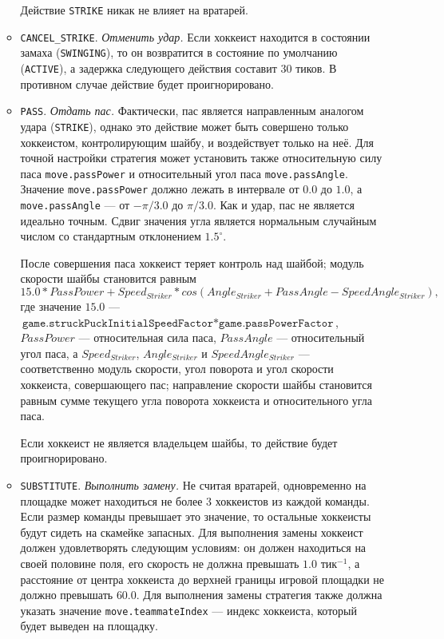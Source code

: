 \begin{itemize}
\begin{itemize}
          Действие \texttt{STRIKE} никак не влияет на вратарей.
    \item \texttt{CANCEL\_STRIKE}. \textit{Отменить удар.} Если хоккеист находится в состоянии замаха (\texttt{SWINGING}), то он возвратится
          в состояние по умолчанию (\texttt{ACTIVE}), а задержка следующего действия составит $30$ тиков. В противном случае действие будет
          проигнорировано.
    \item \texttt{PASS}. \textit{Отдать пас.} Фактически, пас является направленным аналогом удара (\texttt{STRIKE}), однако это действие
          может быть совершено только хоккеистом, контролирующим шайбу, и воздействует только на неё. Для точной настройки стратегия может
          установить также относительную силу паса \texttt{move.passPower} и относительный угол паса \texttt{move.passAngle}. Значение
          \texttt{move.passPower} должно лежать в интервале от $0.0$ до $1.0$, а \texttt{move.passAngle} --- от $-\pi/3.0$ до $\pi/3.0$.
          Как и удар, пас не является идеально точным. Сдвиг значения угла является нормальным случайным числом со стандартным отклонением
          $1.5^\circ$.

          После совершения паса хоккеист теряет контроль над шайбой; модуль скорости шайбы становится равным
          \begin{equation}
          15.0*PassPower+Speed_{Striker}*cos(Angle_{Striker}+PassAngle-SpeedAngle_{Striker}),
          \end{equation}
          где значение $15.0$ --- $\texttt{game.struckPuckInitialSpeedFactor}*\texttt{game.passPowerFactor}$, $PassPower$ --- относительная
          сила паса, $PassAngle$ --- относительный угол паса, а $Speed_{Striker}$, $Angle_{Striker}$ и $SpeedAngle_{Striker}$ ---
          соответственно модуль скорости, угол поворота и угол скорости хоккеиста, совершающего пас; направление скорости шайбы становится
          равным сумме текущего угла поворота хоккеиста и относительного угла паса.

          Если хоккеист не является владельцем шайбы, то действие будет проигнорировано.
    \item \texttt{SUBSTITUTE}. \textit{Выполнить замену.} Не считая вратарей, одновременно на площадке может находиться не более $3$
          хоккеистов из каждой команды. Если размер команды превышает это значение, то остальные хоккеисты будут сидеть на скамейке
          запасных. Для выполнения замены хоккеист должен удовлетворять следующим условиям: он должен находиться на своей половине поля, его
          скорость не должна превышать $1.0$ тик$^{-1}$, а расстояние от центра хоккеиста до верхней границы игровой площадки не должно
          превышать $60.0$. Для выполнения замены стратегия также должна указать значение \texttt{move.teammateIndex} --- индекс хоккеиста,
          который будет выведен на площадку.


\end{itemize}
\end{itemize}
